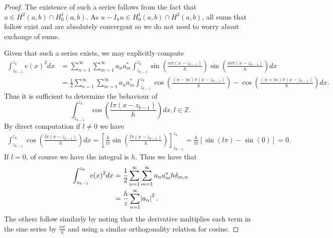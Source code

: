 \documentclass{amsart}
\theoremstyle{plain}
\theoremstyle{definition}
\newcommand{\Z}{\mathbb{Z}}
\begin{document}
\begin{proof}
    The existence of such a series follows from the fact that $u\in H^2(a,b) \cap H_0^1(a,b)$. As $u-I_h u \in H_0^1(a,b)\cap H^2(a,b)$, all sums that follow exist and are absolutely convergent so we do not need to worry about exchange of sums. 
    \par Given that such a series exists, we may explicitly compute 
    \begin{align*}
        \int_{z_{k-1}}^{z_k} e(x)^2 dx &= \sum_{n=1}^\infty \sum_{m=1}^\infty a_n a_m^* \int_{z_{k-1}}^{z_k} \sin\left(\frac{n\pi (x-z_{k-1})}{h}\right)\sin\left(\frac{m\pi (x-z_{k-1})}{h}\right) dx\\
        &=  \frac{1}{2}\sum_{n=1}^\infty \sum_{m=1}^\infty a_n a_m^* \int_{z_{k-1}}^{z_k} \cos\left(\frac{(n-m)\pi (x-z_{k-1})}{h}\right) - \cos\left(\frac{(n+m)\pi (x-z_{k-1})}{h}\right) dx.
    \end{align*}
    Thus it is sufficient to determine the behaviour of $$\int_{z_{k-1}}^{z_k} \cos\left(\frac{l\pi (x-z_{k-1})}{h}\right) dx, l\in \Z. $$ By direct computation if $l\neq 0$ we have
    \begin{align*}
        \int_{z_{k-1}}^{z_k} \cos\left(\frac{l\pi (x-z_{k-1})}{h}\right) dx = \left[\frac{h}{l\pi} \sin\left(\frac{l\pi (x-z_{k-1})}{h}\right)\right]_{z_{k-1}}^{z_k} = \frac{h}{l\pi} \left[\sin(l\pi) - \sin(0)\right] = 0. 
    \end{align*}
    If $l= 0$, of course we have the integral is $h$. Thus we have that 
     \begin{align*}
        \int_{z_{k-1}}^{z_k} e(x)^2 dx  &=  \frac{1}{2}\sum_{n=1}^\infty \sum_{m=1}^\infty a_n a_m^* h \delta_{m,n} \\
        &= \frac{h}{z}\sum_{n=1}^{\infty} \abs{a_n}^2.
    \end{align*}
    The others follow similarly by noting that the derivative multiplies each term in the sine series by $\frac{n\pi}{h}$ and using a similar orthogonality relation for cosine. 
\end{proof}
\end{document}
